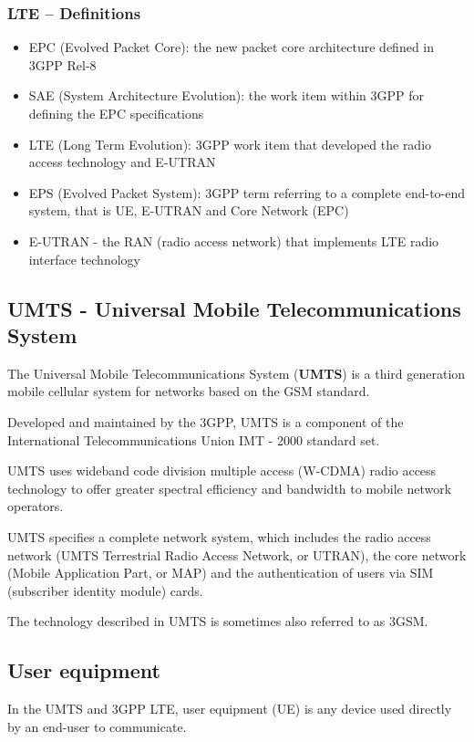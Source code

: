 \subsubsection{LTE – Definitions}

\begin{itemize}
  \item EPC (Evolved Packet Core): the new packet core architecture defined in
3GPP Rel-8
  \item SAE (System Architecture Evolution): the work item within 3GPP for
defining the EPC specifications
  \item LTE (Long Term Evolution): 3GPP work item that developed the radio
access technology and E-UTRAN
  \item EPS (Evolved Packet System): 3GPP term referring to a complete
end-to-end system, that is UE, E-UTRAN and Core Network (EPC)
  \item E-UTRAN - the RAN (radio access network) that implements LTE radio
interface technology
\end{itemize}

\subsection{UMTS - Universal Mobile Telecommunications System}

The Universal Mobile Telecommunications System (\textbf{UMTS}) is a third
generation mobile cellular system for networks based on the GSM standard.

Developed and maintained by the 3GPP, UMTS is a component of the International
Telecommunications Union IMT - 2000 standard set.

UMTS uses wideband code division multiple access (W-CDMA) radio access
technology to offer greater spectral efficiency and bandwidth to mobile network
operators.

UMTS specifies a complete network system, which includes the radio access
network (UMTS Terrestrial Radio Access Network, or UTRAN), the core network
(Mobile Application Part, or MAP) and the authentication of users via SIM
(subscriber identity module) cards.

The technology described in UMTS is sometimes also referred to as 3GSM.

\subsection{User equipment}

In the UMTS and 3GPP LTE, user equipment (UE) is any device used directly by an
end-user to communicate.

